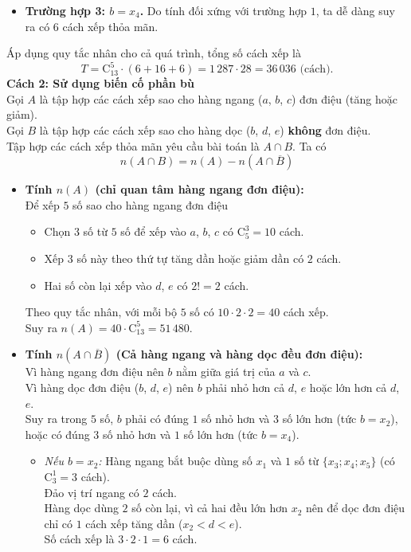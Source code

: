 \begin{ex}
{\begin{itemize}
\begin{itemize}
			\end{itemize}
			Theo quy tắc nhân, trường hợp $2$ có $8 \times 2 = 16$ cách.
			\item \textbf{Trường hợp 3: $b = x_4$.}
			Do tính đối xứng với trường hợp $1$, ta dễ dàng suy ra có $6$ cách xếp thỏa mãn.
		\end{itemize}
		Áp dụng quy tắc nhân cho cả quá trình, tổng số cách xếp là
		\[T = \mathrm{C}_{13}^{5} \cdot (6 + 16 + 6) = 1\,287 \cdot 28 = 36\,036 \text{ (cách)}.\]
		\noindent \textbf{Cách 2: Sử dụng biến cố phần bù}\\
		Gọi $A$ là tập hợp các cách xếp sao cho hàng ngang ($a$, $b$, $c$) đơn điệu (tăng hoặc giảm).\\
		Gọi $B$ là tập hợp các cách xếp sao cho hàng dọc ($b$, $d$, $e$) \textbf{không} đơn điệu.\\
		Tập hợp các cách xếp thỏa mãn yêu cầu bài toán là $A \cap B$. Ta có
		\[n(A \cap B) = n(A) - n\left(A \cap \overline{B}\right)\]
		\begin{itemize}
			\item \textbf{Tính $n(A)$ (chỉ quan tâm hàng ngang đơn điệu):}\\
			Để xếp $5$ số sao cho hàng ngang đơn điệu
			\begin{itemize}
				\item Chọn $3$ số từ $5$ số để xếp vào $a$, $b$, $c$ có $\mathrm{C}_5^3 = 10$ cách.
				\item Xếp $3$ số này theo thứ tự tăng dần hoặc giảm dần có $2$ cách.
				\item Hai số còn lại xếp vào $d$, $e$ có $2! = 2$ cách.
			\end{itemize}
			Theo quy tắc nhân, với mỗi bộ $5$ số có $10 \cdot 2 \cdot 2 = 40$ cách xếp. \\
			Suy ra $n(A) = 40 \cdot \mathrm{C}_{13}^5 = 51\,480$.
			\item \textbf{Tính $n\left(A \cap \overline{B}\right)$ (Cả hàng ngang và hàng dọc đều đơn điệu):}\\
			Vì hàng ngang đơn điệu nên $b$ nằm giữa giá trị của $a$ và $c$. \\
			Vì hàng dọc đơn điệu ($b$, $d$, $e$) nên $b$ phải nhỏ hơn cả $d$, $e$ hoặc lớn hơn cả $d$, $e$.\\
			Suy ra trong $5$ số, $b$ phải có đúng $1$ số nhỏ hơn và $3$ số lớn hơn (tức $b = x_2$), hoặc có đúng $3$ số nhỏ hơn và $1$ số lớn hơn (tức $b = x_4$).
			\begin{itemize}
				\item \textit{Nếu $b = x_2$:} Hàng ngang bắt buộc dùng số $x_1$ và $1$ số từ $\{x_3; x_4; x_5\}$ (có $\mathrm{C}_3^1 = 3$ cách).\\ Đảo vị trí ngang có $2$ cách.\\ Hàng dọc dùng $2$ số còn lại, vì cả hai đều lớn hơn $x_2$ nên để dọc đơn điệu chỉ có $1$ cách xếp tăng dần ($x_2 < d < e$).\\ Số cách xếp là $3 \cdot 2 \cdot 1 = 6$ cách.

\end{itemize}
\end{itemize}}
\end{ex}
